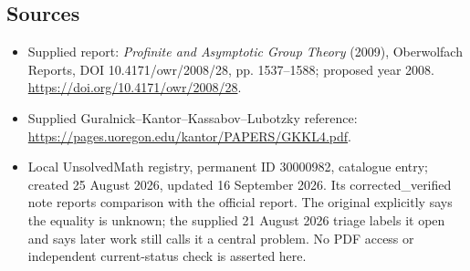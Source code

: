 \documentclass[11pt]{article}
\begin{document}
\subsection{Sources}
\begin{itemize}
\item Supplied report: \emph{Profinite and Asymptotic Group Theory} (2009), Oberwolfach Reports, DOI 10.4171/owr/2008/28, pp. 1537--1588; proposed year 2008. \url{https://doi.org/10.4171/owr/2008/28}.
\item Supplied Guralnick--Kantor--Kassabov--Lubotzky reference: \url{https://pages.uoregon.edu/kantor/PAPERS/GKKL4.pdf}.
\item Local UnsolvedMath registry, permanent ID 30000982, catalogue entry; created 25 August 2026, updated 16 September 2026. Its corrected\_verified note reports comparison with the official report. The original explicitly says the equality is unknown; the supplied 21 August 2026 triage labels it open and says later work still calls it a central problem. No PDF access or independent current-status check is asserted here.
\end{itemize}
\end{document}
